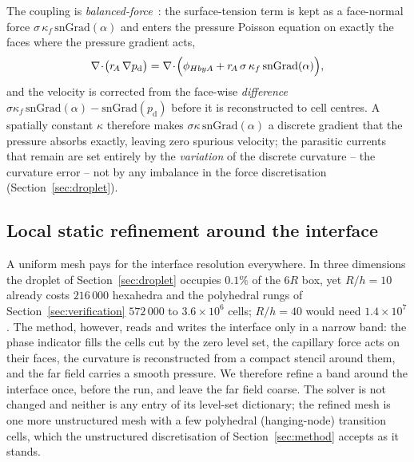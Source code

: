 \documentclass[preprint,3p,11pt]{elsarticle}
\begin{document}
The coupling is \emph{balanced-force}~\cite{francois2006}: the surface-tension term is kept
as a face-normal force $\sigma\,\kappa_f\,\mathrm{snGrad}(\alpha)$ and enters the pressure
Poisson equation on exactly the faces where the pressure gradient acts,
\begin{equation}
  \nabla\!\cdot\!\bigl(r_{\!A}\,\nabla p_{\mathrm{d}}\bigr)
  = \nabla\!\cdot\!\Bigl(\phi_{HbyA}
      + r_{\!A}\,\sigma\,\kappa_f\,\mathrm{snGrad}(\alpha)\Bigr),
  \label{eq:ppoisson}
\end{equation}
and the velocity is corrected from the face-wise \emph{difference}
$\sigma\kappa_f\,\mathrm{snGrad}(\alpha)-\mathrm{snGrad}(p_{\mathrm{d}})$ before it is
reconstructed to cell centres. A spatially constant $\kappa$ therefore makes
$\sigma\kappa\,\mathrm{snGrad}(\alpha)$ a discrete gradient that the pressure absorbs
exactly, leaving zero spurious velocity; the parasitic currents that remain are set entirely
by the \emph{variation} of the discrete curvature -- the curvature error -- not by any
imbalance in the force discretisation (Section~\ref{sec:droplet}).

\subsection{Local static refinement around the interface}
\label{sec:staticrefine}
A uniform mesh pays for the interface resolution everywhere. In three dimensions the
droplet of Section~\ref{sec:droplet} occupies $0.1\%$ of the $6R$ box, yet $R/h=10$
already costs $216\,000$ hexahedra and the polyhedral rungs of
Section~\ref{sec:verification} $572\,000$ to $3.6\times10^6$ cells; $R/h=40$ would need
$1.4\times10^7$. The method, however, reads and writes the interface only in a narrow
band: the phase indicator fills the cells cut by the zero level set, the capillary force
acts on their faces, the curvature is reconstructed from a compact stencil around them,
and the far field carries a smooth pressure. We therefore refine a band around the
interface once, before the run, and leave the far field coarse. The solver is not
changed and neither is any entry of its level-set dictionary; the refined mesh is one
more unstructured mesh with a few polyhedral (hanging-node) transition cells, which the
unstructured discretisation of Section~\ref{sec:method} accepts as it stands.
\end{document}
